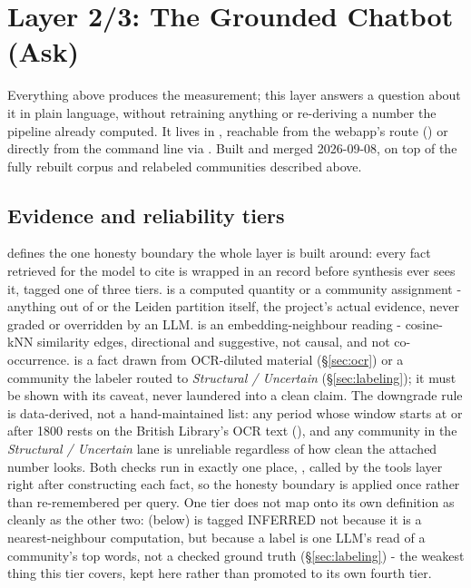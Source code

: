 \documentclass[11pt]{article}
\begin{document}
\section{Layer 2/3: The Grounded Chatbot (Ask)}
\label{sec:rag}

Everything above produces the measurement; this layer answers a
question about it in plain language, without retraining anything or
re-deriving a number the pipeline already computed. It lives in
, reachable from the webapp's  route
() or directly from the command line via
. Built and merged 2026-09-08, on top of the
fully rebuilt corpus and relabeled communities described above.

\subsection{Evidence and reliability tiers}

 defines the one honesty boundary the whole
layer is built around: every fact retrieved for the model to cite is
wrapped in an  record before synthesis ever sees it,
tagged one of three tiers.  is a computed quantity or a
community assignment - anything out of  or the Leiden
partition itself, the project's actual evidence, never graded or
overridden by an LLM.  is an embedding-neighbour
reading - cosine-kNN similarity edges, directional and suggestive, not
causal, and not co-occurrence.  is a fact drawn from
OCR-diluted material (\S\ref{sec:ocr}) or a community the labeler
routed to \emph{Structural / Uncertain} (\S\ref{sec:labeling}); it must
be shown with its caveat, never laundered into a clean claim. The
downgrade rule is data-derived, not a hand-maintained list: any period
whose window starts at or after 1800 rests on the British Library's
OCR text (), and any community in the
\emph{Structural / Uncertain} lane is unreliable regardless of how
clean the attached number looks. Both checks run in exactly one place,
, called by the tools layer right after
constructing each fact, so the honesty boundary is applied once rather
than re-remembered per query. One tier does not map onto its own
definition as cleanly as the other two:  (below)
is tagged INFERRED not because it is a nearest-neighbour computation,
but because a label is one LLM's read of a community's top words, not
a checked ground truth (\S\ref{sec:labeling}) - the weakest thing this
tier covers, kept here rather than promoted to its own fourth tier.
\end{document}
